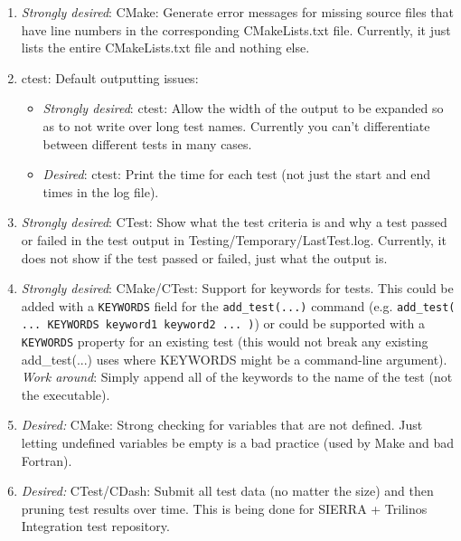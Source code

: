 \documentclass[pdf,ps2pdf,11pt]{SANDreport}
\begin{document}
\begin{enumerate}

{}\item\textit{Strongly desired}: CMake: Generate error messages for
missing source files that have line numbers in the corresponding
CMakeLists.txt file.  Currently, it just lists the entire
CMakeLists.txt file and nothing else.



{}\item ctest: Default outputting issues:

  \begin{itemize}
  
  {}\item\textit{Strongly desired}: ctest: Allow the width of the
  output to be expanded so as to not write over long test
  names. Currently you can't differentiate between different tests in
  many cases.
  
  {}\item\textit{Desired}: ctest: Print the time for each test (not
  just the start and end times in the log file).

  \end{itemize}

{}\item\textit{Strongly desired}: CTest: Show what the test criteria
is and why a test passed or failed in the test output in
Testing/Temporary/LastTest.log.  Currently, it does not show if the
test passed or failed, just what the output is.

{}\item\textit{Strongly desired}: CMake/CTest: Support for keywords
for tests.  This could be added with a {}\texttt{KEYWORDS} field for
the {}\texttt{add\_test(...)} command (e.g. {}\texttt{add\_test(
... KEYWORDS keyword1 keyword2 ... )}) or could be supported with a
{}\texttt{KEYWORDS} property for an existing test (this would not
break any existing add\_test(...) uses where KEYWORDS might be a
command-line argument).  {}\textit{Work around}: Simply append all of
the keywords to the name of the test (not the executable).

{}\item\textit{Desired:} CMake: Strong checking for variables that are
not defined.  Just letting undefined variables be empty is a bad
practice (used by Make and bad Fortran).

{}\item\textit{Desired:} CTest/CDash: Submit all test data (no matter
the size) and then pruning test results over time.  This is being done
for SIERRA + Trilinos Integration test repository.

\end{enumerate}
\end{document}
